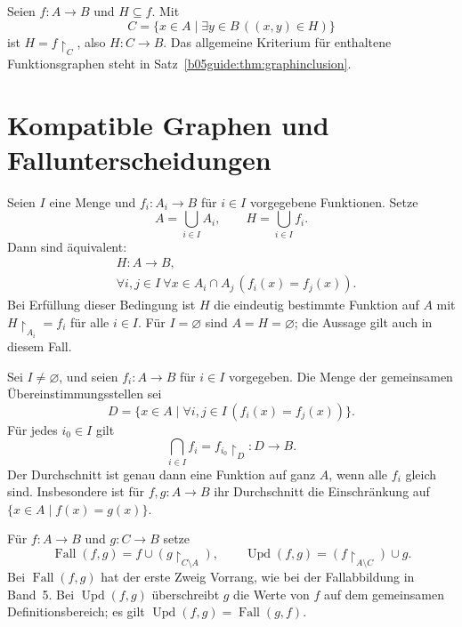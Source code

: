 \begin{theorem}
\label{b05guide:thm:subgraphs}
Seien $f\colon A\to B$ und $H\subseteq f$. Mit
\[
 C=\{x\in A\mid\exists y\in B\,((x,y)\in H)\}
\]
ist $H=f\restriction_C$, also $H\colon C\to B$.
Das allgemeine Kriterium für enthaltene Funktionsgraphen steht in
Satz~\ref{b05guide:thm:graphinclusion}.
\end{theorem}

\section{Kompatible Graphen und Fallunterscheidungen}

\begin{theorem}
\label{b05guide:thm:gluing}
Seien $I$ eine Menge und $f_i\colon A_i\to B$ für $i\in I$
vorgegebene Funktionen. Setze
\[
 A=\bigcup_{i\in I}A_i,\qquad H=\bigcup_{i\in I}f_i.
\]
Dann sind äquivalent:
\[
 \begin{aligned}
 &H\colon A\to B,\\
 &\forall i,j\in I\ \forall x\in A_i\cap A_j\,
                         (f_i(x)=f_j(x)).
 \end{aligned}
\]
Bei Erfüllung dieser Bedingung ist $H$ die eindeutig bestimmte
Funktion auf $A$ mit $H\restriction_{A_i}=f_i$ für alle $i\in I$.
Für $I=\varnothing$ sind $A=H=\varnothing$;
die Aussage gilt auch in diesem Fall.
\end{theorem}

\begin{theorem}
\label{b05guide:thm:graph-intersection}
Sei $I\ne\varnothing$, und seien $f_i\colon A\to B$
für $i\in I$ vorgegeben. Die Menge der gemeinsamen
Übereinstimmungsstellen sei
\[
 D=\{x\in A\mid\forall i,j\in I\,(f_i(x)=f_j(x))\}.
\]
Für jedes $i_0\in I$ gilt
\[
 \bigcap_{i\in I}f_i=f_{i_0}\restriction_D\colon D\to B.
\]
Der Durchschnitt ist genau dann eine Funktion auf ganz $A$,
wenn alle $f_i$ gleich sind. Insbesondere ist für
$f,g\colon A\to B$ ihr Durchschnitt die Einschränkung
auf $\{x\in A\mid f(x)=g(x)\}$.
\end{theorem}

\begin{definition}
\label{b05guide:def:case-override}
Für $f\colon A\to B$ und $g\colon C\to B$ setze
\[
 \operatorname{Fall}(f,g)
       =f\cup(g\restriction_{C\setminus A}),\qquad
 \operatorname{Upd}(f,g)
       =(f\restriction_{A\setminus C})\cup g.
\]
Bei $\operatorname{Fall}(f,g)$ hat der erste Zweig Vorrang,
wie bei der Fallabbildung in Band~5.
Bei $\operatorname{Upd}(f,g)$ überschreibt $g$ die Werte
von $f$ auf dem gemeinsamen Definitionsbereich;
es gilt $\operatorname{Upd}(f,g)=\operatorname{Fall}(g,f)$.
\end{definition}

